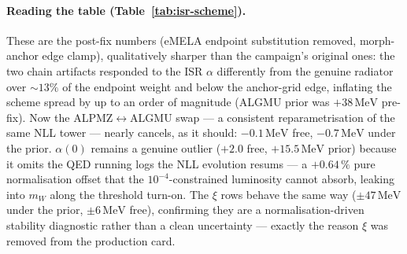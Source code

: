 \documentclass[11pt,a4paper]{article}
\newcommand{\mW}{m_W}
\newcommand{\MeV}{\ensuremath{\,\mathrm{MeV}}}
\begin{document}
\paragraph{Reading the table (Table~\ref{tab:isr-scheme}).}
These are the post-fix numbers (eMELA endpoint substitution
removed, morph-anchor edge clamp), qualitatively sharper than
the campaign's original ones: the two chain artifacts responded to the
ISR $\alpha$ differently from the genuine radiator over $\sim\!13\%$ of
the endpoint weight and below the anchor-grid edge, inflating the scheme
spread by up to an order of magnitude (ALGMU prior was $+38\MeV$
pre-fix). Now the ALPMZ$\leftrightarrow$ALGMU swap --- a consistent
reparametrisation of the same NLL tower --- nearly cancels, as it should:
$-0.1\MeV$ free, $-0.7\MeV$ under the prior. $\alpha(0)$ remains a
genuine outlier ($+2.0$ free, $+15.5\MeV$ prior) because it omits the
QED running logs the NLL evolution resums --- a $+0.64\,\%$ pure
normalisation offset that the $10^{-4}$-constrained luminosity cannot
absorb, leaking into $\mW$ along the threshold turn-on. The $\xi$ rows
behave the same way ($\pm47\MeV$ under the prior, $\pm6\MeV$ free),
confirming they are a normalisation-driven stability diagnostic rather
than a clean uncertainty --- exactly the reason $\xi$ was removed from
the production card.
\end{document}
